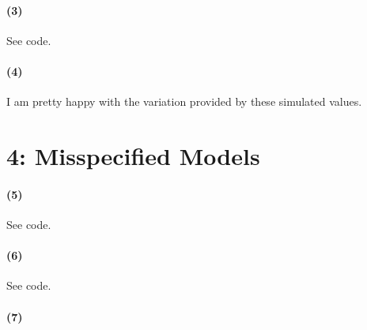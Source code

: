 \documentclass[10pt,letter]{article}
\begin{document}
\paragraph{(3)} See code.
\paragraph{(4)} I am pretty happy with the variation provided by these simulated values.
\section*{4: Misspecified Models}
\paragraph{(5)} See code.
\paragraph{(6)} See code.
\paragraph{(7)}
\end{document}
